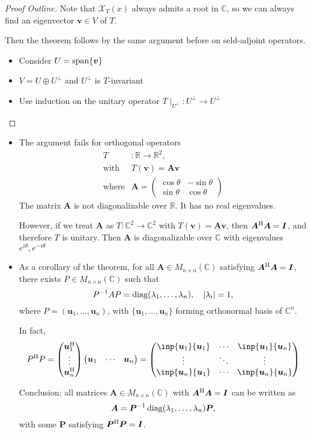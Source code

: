 \begin{proof}[Proof Outline]
Note that $\mathcal{X}_T(x)$ always admits a root in $\mathbb{C}$, so we can always find an eigenvector $\bm v\in V$ of $T$.

Then the theorem follows by the same argument before on seld-adjoint operators.
\begin{itemize}
\item
Consider $U=\operatorname{span}\{\bm v\}$
\item
$V=U\oplus U^\perp$ and $U^\perp$ is $T$-invariant
\item
Use induction on the unitary operator $T\mid_{U^\perp}:U^\perp\to U^\perp$
\end{itemize}
\end{proof}
\begin{remark}
\begin{itemize}
\item
The argument fails for orthogonal operators
\[
\begin{array}{ll}
T&:\mathbb{R}\to\mathbb{R}^2,\\
\text{with}&T(\bm v)=\bm A\bm v\\
\text{where}&\bm A=\begin{pmatrix}
\cos\theta&-\sin\theta\\
\sin\theta&\cos\theta
\end{pmatrix}
\end{array}
\]
The matrix $\bm A$ is not diagonalizable over $\mathbb{R}$.
It has no real eigenvalues.

However, if we treat $\bm A$ as $T:\mathbb{C}^2\to\mathbb{C}^2$ with $T(\bm v)=\bm A\bm v$, then $\bm A^{\mathrm H}\bm A=\bm I$, and therefore $T$ is unitary.
Then $\bm A$ is diagonalizable over $\mathbb{C}$ with eigenvalues $e^{i\theta},e^{-i\theta}$
\item
As a corollary of the theorem, for all $\bm A\in M_{n\times n}(\mathbb{C})$ satisfying $\bm A^{\mathrm H}\bm A=\bm I$, there exists $P\in M_{n\times n}(\mathbb{C})$ such that 
\[
P^{-1}AP=\operatorname{diag}(\lambda_1,\dots,\lambda_n),\quad
|\lambda_i|=1,
\]
where $P=(\bm u_1,\dots,\bm u_n)$, with $\{\bm u_1,\dots,\bm u_n\}$ forming orthonormal basis of $\mathbb{C}^n$.

In fact, 
\[
P\Her P=\begin{pmatrix}
\bm u_1\Her
\\
\vdots\\
\bm u_n\Her
\end{pmatrix}\begin{pmatrix}
\bm u_1&\cdots&\bm u_n
\end{pmatrix}
=
\begin{pmatrix}
\inp{\bm u_1}{\bm u_1}&\cdots&\inp{\bm u_1}{\bm u_n}\\
\vdots&\ddots&\vdots\\
\inp{\bm u_n}{\bm u_1}&\cdots&\inp{\bm u_n}{\bm u_n}
\end{pmatrix}
\]

Conclusion: all matrices $\bm A\in M_{n\times n}(\mathbb{C})$ with $\bm A^{\mathrm H}\bm A=\bm I$ can be written as
\[
\bm A = \bm P^{-1}\operatorname{diag}(\lambda_1,\dots,\lambda_n)\bm P,
\]
with some $\bm P$ satisfying $\bm P^{\mathrm H}\bm P=\bm I$.
\end{itemize}
\end{remark}

